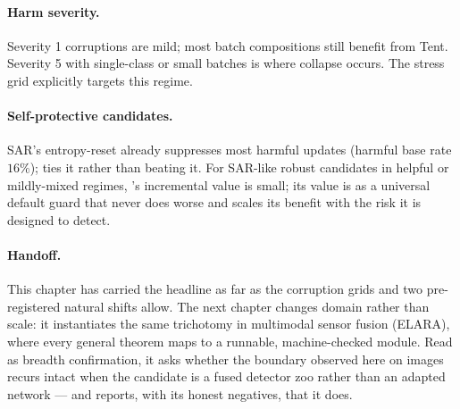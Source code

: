\paragraph{Harm severity.}
Severity 1 corruptions are mild; most batch compositions still benefit from Tent.
Severity 5 with single-class or small batches is where collapse occurs.  The
stress grid explicitly targets this regime.

\paragraph{Self-protective candidates.}
SAR's entropy-reset already suppresses most harmful updates (harmful base rate $16\%$);
\KGA{} ties it rather than beating it.  For SAR-like robust candidates in helpful
or mildly-mixed regimes, \KGA{}'s incremental value is small; its value is as a
universal default guard that never does worse and scales its benefit with the risk it
is designed to detect.

\paragraph{Handoff.}
This chapter has carried the headline as far as the corruption grids and two pre-registered
natural shifts allow.  The next chapter changes domain rather than scale: it instantiates
the same trichotomy in multimodal sensor fusion (ELARA), where every general theorem maps
to a runnable, machine-checked module.  Read as breadth confirmation, it asks whether the
boundary observed here on images recurs intact when the candidate is a fused detector zoo
rather than an adapted network --- and reports, with its honest negatives, that it does.

